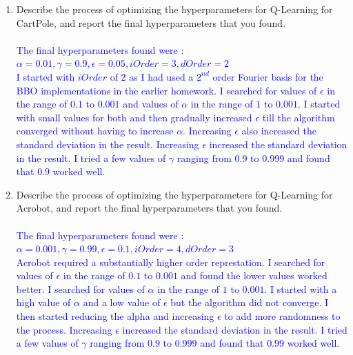\documentclass[]{article}
\begin{document}
\begin{enumerate}
    \item Describe the process of optimizing the hyperparameters for Q-Learning for CartPole, and report the final hyperparameters that you found.
    \\\\
    \textcolor{blue}{
    	The final hyperparameters found were :\\
    	$
    	\alpha  = 0.01,
    	\gamma = 0.9,
    	\epsilon = 0.05,
    	iOrder = 3,
    	dOrder = 2
    	$\\
    	I started with $iOrder$ of 2 as I had used a $2^{nd}$ order Fourier basis for the BBO implementations in the earlier homework. I searched for values of $\epsilon$ in the range of $0.1$ to $0.001$ and values of $\alpha$ in the range of $1$ to $0.001$.  I started with small values for both and then gradually increased $\epsilon$ till the algorithm converged without having to increase $\alpha$. Increasing $\epsilon$ also increased the standard deviation in the result. Increasing $\epsilon$ increased the standard deviation in the result. I tried a few values of $\gamma$ ranging from $0.9$ to $0.999$ and found that $0.9$ worked well.
    }

    \item Describe the process of optimizing the hyperparameters for Q-Learning for Acrobot, and report the final hyperparameters that you found.
    \\\\
    \textcolor{blue}{
    	The final hyperparameters found were :\\
    	$
    	\alpha  = 0.001,
    	\gamma = 0.99,
    	\epsilon = 0.1,
    	iOrder = 4,
    	dOrder = 3
    	$\\
    	Acrobot required a substantially higher order represtation. I searched for values of $\epsilon$ in the range of $0.1$ to $0.001$ and found the lower values worked better. I searched for values of $\alpha$ in the range of $1$ to $0.001$. I started with a high value of $\alpha$ and a low value of $\epsilon$ but the algorithm did not converge. I then started reducing the alpha and increasing $\epsilon$ to add more randomness to the process. Increasing $\epsilon$ increased the standard deviation in the result. I tried a few values of $\gamma$ ranging from $0.9$ to $0.999$ and found that $0.99$ worked well.
    }


\end{enumerate}
\end{document}
